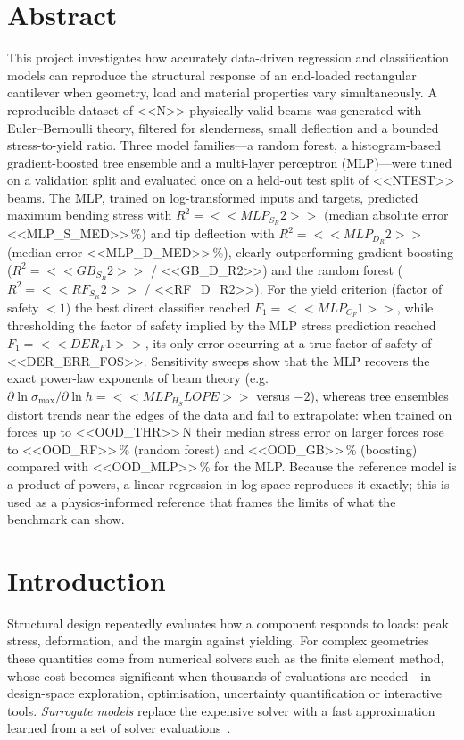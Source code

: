 \documentclass[11pt,a4paper]{article}
\newcommand{\smax}{\sigma_{\max}}
\begin{document}
\section*{Abstract}
This project investigates how accurately data-driven regression and classification models can reproduce the
structural response of an end-loaded rectangular cantilever when geometry, load and material properties vary
simultaneously. A reproducible dataset of <<N>> physically valid beams was generated with Euler--Bernoulli theory,
filtered for slenderness, small deflection and a bounded stress-to-yield ratio. Three model families---a random
forest, a histogram-based gradient-boosted tree ensemble and a multi-layer perceptron (MLP)---were tuned on a
validation split and evaluated once on a held-out test split of <<NTEST>> beams. The MLP, trained on log-transformed
inputs and targets, predicted maximum bending stress with $R^2=<<MLP_S_R2>>$ (median absolute error
<<MLP_S_MED>>\,\%) and tip deflection with $R^2=<<MLP_D_R2>>$ (median error <<MLP_D_MED>>\,\%), clearly
outperforming gradient boosting ($R^2=<<GB_S_R2>>$ / <<GB_D_R2>>) and the random forest ($R^2=<<RF_S_R2>>$ /
<<RF_D_R2>>). For the yield criterion (factor of safety $<1$) the best direct classifier reached
$F_1=<<MLP_C_F1>>$, while thresholding the factor of safety implied by the MLP stress prediction reached
$F_1=<<DER_F1>>$, its only error occurring at a true factor of safety of <<DER_ERR_FOS>>. Sensitivity sweeps show that
the MLP recovers the exact power-law exponents of beam theory (e.g.\ $\partial\ln\smax/\partial\ln h=<<MLP_H_SLOPE>>$
versus $-2$), whereas tree ensembles distort trends near the edges of the data and fail to extrapolate: when trained on
forces up to <<OOD_THR>>\,N their median stress error on larger forces rose to <<OOD_RF>>\,\% (random forest) and
<<OOD_GB>>\,\% (boosting) compared with <<OOD_MLP>>\,\% for the MLP. Because the reference model is a product of powers, a
linear regression in log space reproduces it exactly; this is used as a physics-informed reference that frames the
limits of what the benchmark can show.

\section{Introduction}
Structural design repeatedly evaluates how a component responds to loads: peak stress, deformation, and the margin
against yielding. For complex geometries these quantities come from numerical solvers such as the finite element
method, whose cost becomes significant when thousands of evaluations are needed---in design-space exploration,
optimisation, uncertainty quantification or interactive tools. \emph{Surrogate models} replace the expensive solver with
a fast approximation learned from a set of solver evaluations~\cite{forrester2008}.
\end{document}
